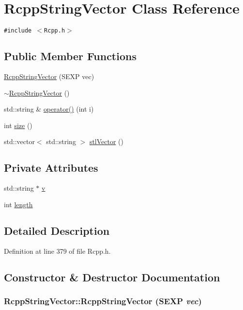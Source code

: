 \hypertarget{classRcppStringVector}{
\section{RcppStringVector Class Reference}
\label{classRcppStringVector}
}
{\tt \#include $<$Rcpp.h$>$}

\subsection*{Public Member Functions}
\begin{CompactItemize}
\item 
\hyperlink{classRcppStringVector_f0216e26ab72efb7a6b07182224f84c5}{RcppStringVector} (SEXP vec)
\item 
\hyperlink{classRcppStringVector_1b0550e206ac6945b00ee02c3c4bf373}{$\sim$RcppStringVector} ()
\item 
std::string \& \hyperlink{classRcppStringVector_ea5aa96f98f1c5b21e3c56ff60c7c413}{operator()} (int i)
\item 
int \hyperlink{classRcppStringVector_c52a8eb61411546a62a70636709b1172}{size} ()
\item 
std::vector$<$ std::string $>$ \hyperlink{classRcppStringVector_2bd817c9332e1446ddf034938b256cc3}{stlVector} ()
\end{CompactItemize}
\subsection*{Private Attributes}
\begin{CompactItemize}
\item 
std::string $\ast$ \hyperlink{classRcppStringVector_94d14fa5093cc8219cbcb91aadfed09e}{v}
\item 
int \hyperlink{classRcppStringVector_aa2e2e4335d14e46fc96b07836e99573}{length}
\end{CompactItemize}


\subsection{Detailed Description}


Definition at line 379 of file Rcpp.h.

\subsection{Constructor \& Destructor Documentation}
\hypertarget{classRcppStringVector_f0216e26ab72efb7a6b07182224f84c5}{
\subsubsection[{RcppStringVector}]{\setlength{\rightskip}{0pt plus 5cm}RcppStringVector::RcppStringVector (SEXP {\em vec})}}
\label{classRcppStringVector_f0216e26ab72efb7a6b07182224f84c5}




